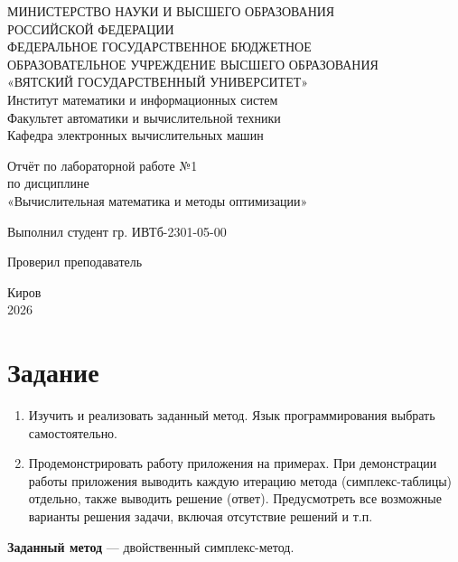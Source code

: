 \documentclass[oneside,a4paper,14pt]{extarticle}
\begin{document}
\newpage\thispagestyle{empty}
\begin{center}
    МИНИСТЕРСТВО НАУКИ И ВЫСШЕГО ОБРАЗОВАНИЯ\\
    РОССИЙСКОЙ ФЕДЕРАЦИИ\\
    ФЕДЕРАЛЬНОЕ ГОСУДАРСТВЕННОЕ БЮДЖЕТНОЕ\\
    ОБРАЗОВАТЕЛЬНОЕ УЧРЕЖДЕНИЕ ВЫСШЕГО ОБРАЗОВАНИЯ\\
    «ВЯТСКИЙ ГОСУДАРСТВЕННЫЙ УНИВЕРСИТЕТ»\\
    Институт математики и информационных систем\\
    Факультет автоматики и вычислительной техники\\
    Кафедра электронных вычислительных машин
\end{center}

\vspace{20mm}
\begin{center}

    Отчёт по лабораторной работе №1\\
    по дисциплине\\
    «Вычислительная математика и методы оптимизации»\\
\end{center}
\vfill

Выполнил студент гр. ИВТб-2301-05-00 \hfill
{}

Проверил преподаватель\hfill
{}

\vfill
\begin{center}
    Киров\\
    2026
\end{center}

\newpage
\setcounter{page}{1}
\tableofcontents
\newpage

\section{Задание}
\begin{enumerate}
    \item Изучить и реализовать заданный метод. Язык программирования выбрать самостоятельно.
    \item Продемонстрировать работу приложения на примерах. При демонстрации работы приложения выводить каждую итерацию метода (симплекс-таблицы) отдельно, также выводить решение (ответ). Предусмотреть все возможные варианты решения задачи, включая отсутствие решений и т.п.
\end{enumerate}
\textbf{Заданный метод} --- двойственный симплекс-метод.
\end{document}
